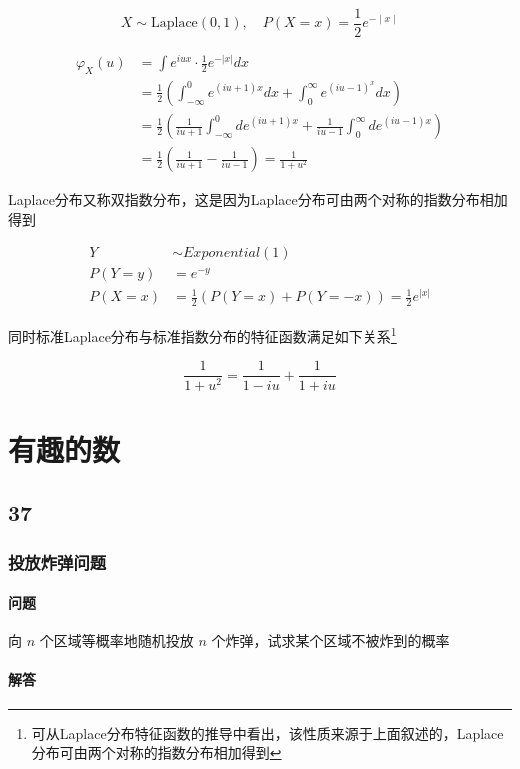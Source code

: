 \documentclass[a4paper, 11pt]{article} %
\begin{document}
$$
X\sim\text{Laplace}(0,1), \quad P(X=x)=\frac{1}{2}e^{-\mid x\mid}
$$

\begin{align*}
\varphi_X(u)&=\int e^{iux}\cdot\frac{1}{2}e^{-|x|}dx\\
&=\frac{1}{2}(\int_{-\infty}^0e^{(iu+1)x}dx+\int_0^\infty e^{(iu-1)^x}dx)\\
&=\frac{1}{2}(\frac{1}{iu+1}\int_{-\infty}^0de^{(iu+1)x}+\frac{1}{iu-1}\int_0^\infty de^{(iu-1)x})\\
&=\frac{1}{2}(\frac{1}{iu+1}-\frac{1}{iu-1})=\frac{1}{1+u^2}
\end{align*}

Laplace分布又称双指数分布，这是因为Laplace分布可由两个对称的指数分布相加得到

\begin{align*}
Y&\sim Exponential(1)\\
P(Y=y)&=e^{-y}\\
P(X=x)&=\frac{1}{2}(P(Y=x)+P(Y=-x))=\frac{1}{2}e^{|x|}
\end{align*}


同时标准Laplace分布与标准指数分布的特征函数满足如下关系\footnote{可从Laplace分布特征函数的推导中看出，该性质来源于上面叙述的，Laplace分布可由两个对称的指数分布相加得到}

$$
\frac{1}{1+u^2}=\frac{1}{1-iu}+\frac{1}{1+iu}
$$


\section{有趣的数}

\subsection{37}

\subsubsection{投放炸弹问题}

\paragraph{问题}

向 $n$ 个区域等概率地随机投放 $n$ 个炸弹，试求某个区域不被炸到的概率

\paragraph{解答}
\end{document}
